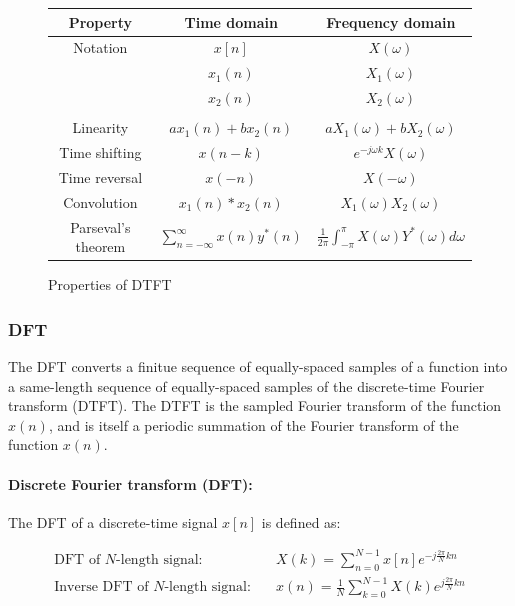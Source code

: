 \documentclass{article}
\begin{document}
\begin{figure}[h!]
    \centering
    \begin{tabular}{|c c c|}
        \hline
        Property & Time domain & Frequency domain \\
        \hline
        Notation & $x[n]$ & $X(\omega)$ \\
        & $x_1(n)$ & $X_1(\omega)$ \\
        & $x_2(n)$ & $X_2(\omega)$ \\
        \\
        Linearity & $ax_1(n) + bx_2(n)$ & $aX_1(\omega) + bX_2(\omega)$ \\
        Time shifting & $x(n-k)$ & $e^{-j\omega k}X(\omega)$ \\
        Time reversal & $x(-n)$ & $X(-\omega)$ \\
        Convolution & $x_1(n) \ast x_2(n)$ & $X_1(\omega)X_2(\omega)$ \\
        Parseval's theorem & $\sum_{n=-\infty}^{\infty}x(n)y^*(n)$ & $\frac{1}{2\pi}\int_{-\pi}^{\pi}X(\omega)Y^*(\omega)d\omega$ \\
        \hline
    \end{tabular}
    \caption{Properties of DTFT}
    \label{table:DTFT_properties}
\end{figure}

\subsubsection{DFT}
The DFT converts a finitue sequence of equally-spaced samples of a function into a same-length sequence of equally-spaced samples of the discrete-time Fourier transform (DTFT). The DTFT is the sampled Fourier transform of the function $x(n)$, and is itself a periodic summation of the Fourier transform of the function $x(n)$.
\paragraph{Discrete Fourier transform (DFT):} The DFT of a discrete-time signal $x[n]$ is defined as:

\begin{align}
    \text{DFT of } N\text{-length signal:} \quad & X(k) = \sum_{n=0}^{N-1} x[n]e^{-j\frac{2\pi}{N}kn} \\
    \text{Inverse DFT of } N\text{-length signal:}  \quad & x(n) = \frac{1}{N}\sum_{k=0}^{N-1} X(k)e^{j\frac{2\pi}{N}kn}
\end{align}
\end{document}
